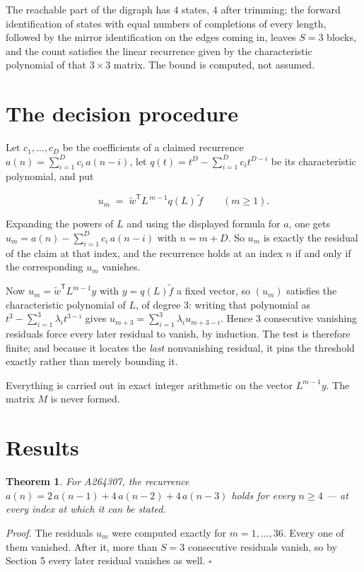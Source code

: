 \documentclass[11pt]{article}
\newtheorem{theorem}{Theorem}
\theoremstyle{definition}
\begin{document}
The reachable part of the digraph has $4$ states, $4$ after trimming; the forward identification of states with equal numbers of completions of every length, followed by the mirror identification on the edges coming in, leaves $S = 3$ blocks, and the count satisfies the linear recurrence given by the characteristic polynomial of that $3\times3$ matrix. The bound is computed, not assumed.

\section{The decision procedure}

Let $c_1,\dots,c_D$ be the coefficients of a claimed recurrence $a(n) = \sum_{i=1}^{D} c_i\,a(n-i)$, let $q(t) = t^{D} - \sum_{i=1}^{D} c_i t^{D-i}$ be its characteristic polynomial, and put

\[u_m \;=\; \tilde w^{\mathsf T} L^{\,m-1} q(L)\,\tilde f \qquad (m \ge 1).\]

Expanding the powers of $L$ and using the displayed formula for $a$, one gets $u_m = a(n) - \sum_{i=1}^{D} c_i\,a(n-i)$ with $n = m + D$. So $u_m$ is exactly the residual of the claim at that index, and the recurrence holds at an index $n$ if and only if the corresponding $u_m$ vanishes.

Now $u_m = \tilde w^{\mathsf T} L^{m-1} y$ with $y = q(L)\tilde f$ a fixed vector, so $(u_m)$ satisfies the characteristic polynomial of $L$, of degree $3$: writing that polynomial as $t^{3} - \sum_{i=1}^{3} \lambda_i t^{3-i}$ gives $u_{m+3} = \sum_{i=1}^{3} \lambda_i u_{m+3-i}$. Hence $3$ consecutive vanishing residuals force every later residual to vanish, by induction. The test is therefore finite; and because it locates the {\itshape last} nonvanishing residual, it pins the threshold exactly rather than merely bounding it.

Everything is carried out in exact integer arithmetic on the vector $L^{m-1}y$. The matrix $M$ is never formed.

\section{Results}

\begin{theorem} For A264307, the recurrence $a(n) = 2\,a(n-1) + 4\,a(n-2) + 4\,a(n-3)$ holds for every $n \ge 4$ --- at every index at which it can be stated.\end{theorem}

{\itshape Proof.} The residuals $u_m$ were computed exactly for $m = 1,\dots,36$. Every one of them vanished. After it, more than $S = 3$ consecutive residuals vanish, so by Section 5 every later residual vanishes as well. $\square$
\end{document}
